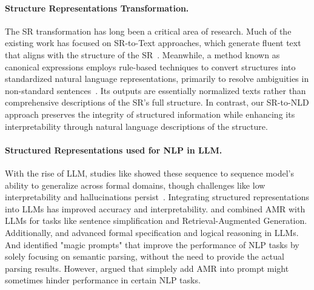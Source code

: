 \paragraph{Structure Representations Transformation.} 
The SR transformation has long been a critical area of research. Much of the existing work has focused on SR-to-Text approaches, which generate fluent text that aligns with the structure of the SR~\cite{song2018graph, ribeiro2021structural, wang2020amr}. Meanwhile, a method known as canonical expressions employs rule-based techniques to convert structures into standardized natural language representations, primarily to resolve ambiguities in non-standard sentences~\cite{shin2021constrained, roy2024benchclamp}. Its outputs are essentially normalized texts rather than comprehensive descriptions of the SR’s full structure. In contrast, our SR-to-NLD approach preserves the integrity of structured information while enhancing its interpretability through natural language descriptions of the structure.


\paragraph{Structured Representations used for NLP in LLM.} With the rise of LLM, studies like \citet{hahn2022formal} showed these sequence to sequence model's ability to generalize across formal domains, though challenges like low interpretability and hallucinations persist~\citet{de2023structuring}. Integrating structured representations into LLMs has improved accuracy and interpretability. \citet{yao2024semantic} and \cite{shi2024compressing} combined AMR with LLMs for tasks like sentence simplification and Retrieval-Augmented Generation. Additionally, \citet{hahn2022formal} and \cite{kalyanpur2024llm} advanced formal specification and logical reasoning in LLMs. And \citet{an2024rethinking} identified "magic prompts" that improve the performance of NLP tasks by solely focusing on semantic parsing, without the need to provide the actual parsing results. However, \citet{jin2024analyzing} argued that simplely add AMR into prompt might sometimes hinder performance in certain NLP tasks. 

